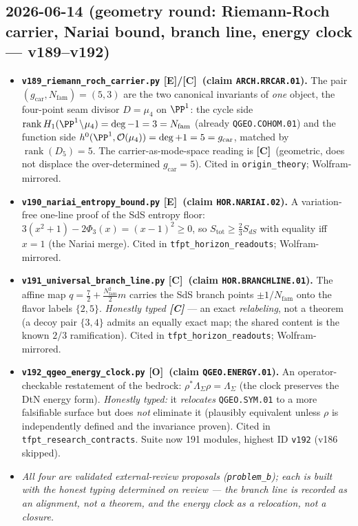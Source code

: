 \documentclass[11pt]{article}
\providecommand{\mE}{\textbf{[E]}}\providecommand{\mC}{\textbf{[C]}}
\providecommand{\mO}{\textbf{[O]}}\providecommand{\mX}{\textbf{[X]}}
\providecommand{\gcar}{g_{\mathrm{car}}}\providecommand{\Nfam}{N_{\mathrm{fam}}}
\begin{document}
\subsection*{2026-06-14 (geometry round: Riemann-Roch carrier, Nariai bound, branch line, energy clock --- v189--v192)}
\begin{itemize}
\item \textbf{\texttt{v189\_riemann\_roch\_carrier.py} \mE/\mC\ (claim \texttt{ARCH.RRCAR.01}).} The pair
  $(\gcar,\Nfam)=(5,3)$ are the two canonical invariants of \emph{one} object, the four-point seam divisor
  $D=\mu_4$ on $\PP^1$: the cycle side $\operatorname{rank}H_1(\PP^1\!\setminus\!\mu_4)=\deg{-}1=3=\Nfam$
  (already \texttt{QGEO.COHOM.01}) and the function side $h^0(\PP^1,\mathcal O(\mu_4))=\deg{+}1=5=\gcar$,
  matched by $\operatorname{rank}(D_5)=5$. The carrier-as-mode-space reading is \mC\ (geometric, does not
  displace the over-determined $\gcar=5$). Cited in \texttt{origin\_theory}; Wolfram-mirrored.
\item \textbf{\texttt{v190\_nariai\_entropy\_bound.py} \mE\ (claim \texttt{HOR.NARIAI.02}).} A
  variation-free one-line proof of the SdS entropy floor: $3(x^2{+}1)-2\Phi_3(x)=(x{-}1)^2\ge0$, so
  $S_{\mathrm{tot}}\ge\tfrac23 S_{dS}$ with equality iff $x=1$ (the Nariai merge). Cited in
  \texttt{tfpt\_horizon\_readouts}; Wolfram-mirrored.
\item \textbf{\texttt{v191\_universal\_branch\_line.py} \mC\ (claim \texttt{HOR.BRANCHLINE.01}).} The affine
  map $q=\tfrac72+\tfrac{\Nfam^2}{2}m$ carries the SdS branch points ${\pm}1/\Nfam$ onto the flavor labels
  $\{2,5\}$. \emph{Honestly typed \mC} --- an exact \emph{relabeling}, not a theorem (a decoy pair $\{3,4\}$
  admits an equally exact map; the shared content is the known $2/3$ ramification). Cited in
  \texttt{tfpt\_horizon\_readouts}; Wolfram-mirrored.
\item \textbf{\texttt{v192\_qgeo\_energy\_clock.py} \mO\ (claim \texttt{QGEO.ENERGY.01}).} An
  operator-checkable restatement of the bedrock: $\rho^*\Lambda_\Sigma\rho=\Lambda_\Sigma$ (the clock
  preserves the DtN energy form). \emph{Honestly typed:} it \emph{relocates} \texttt{QGEO.SYM.01} to a more
  falsifiable surface but does \emph{not} eliminate it (plausibly equivalent unless $\rho$ is independently
  defined and the invariance proven). Cited in \texttt{tfpt\_research\_contracts}. Suite now 191 modules,
  highest ID \texttt{v192} (v186 skipped).
\item \emph{All four are validated external-review proposals (\texttt{problem\_b}); each is built with the
  honest typing determined on review --- the branch line is recorded as an alignment, not a theorem, and
  the energy clock as a relocation, not a closure.}
\end{itemize}
\end{document}
